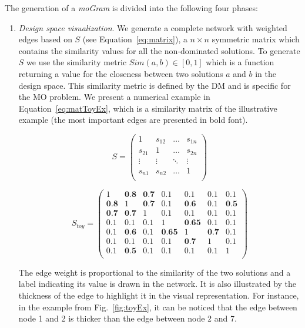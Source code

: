 \documentclass[journal]{IEEEtran}
\begin{document}
The generation of a \emph{moGram} is divided into the following four phases:
\begin{enumerate}

 \item \emph{Design space visualization}. We generate a complete network with weighted edges based on $S$ (see Equation~\ref{eq:matrix}), a $n\times n$ symmetric matrix which contains the similarity values for all the non-dominated solutions. To generate $S$ we use the similarity metric $Sim(a, b) \in [0,1]$ which is a function returning a value for the closeness between two solutions $a$ and $b$ in the design space. This similarity metric is defined by the DM and is specific for the MO problem. We present a numerical example in Equation~\ref{eq:matToyEx}, which is a similarity matrix of the illustrative example (the most important edges are presented in bold font).
 


\begin{equation}
\label{eq:matrix}
S = 
\left(
\begin{array}{cccc}
1 & s_{12} & \dots & s_{1n} \\
s_{21} & 1 & \dots & s_{2n} \\
\vdots & \vdots & \ddots & \vdots \\
s_{n1} & s_{n2} & \dots & 1 \\
\end{array}
\right)
\end{equation}

\begin{equation}
\label{eq:matToyEx}
S_{toy} = 
\left(
\begin{array}{ccccccc}
1 & \textbf{0.8} & \textbf{0.7} & 0.1 & 0.1 & 0.1 & 0.1 \\
\textbf{0.8} & 1 & \textbf{0.7} & 0.1 & \textbf{0.6} & 0.1 & \textbf{0.5} \\
\textbf{0.7} & \textbf{0.7} & 1 & 0.1 & 0.1 & 0.1 & 0.1 \\
0.1 & 0.1 & 0.1 & 1 & \textbf{0.65} & 0.1 & 0.1 \\
0.1 & \textbf{0.6} & 0.1 & \textbf{0.65} & 1 & \textbf{0.7} & 0.1 \\
0.1 & 0.1 & 0.1 & 0.1 & \textbf{0.7} & 1 & 0.1 \\
0.1 & \textbf{0.5} & 0.1 & 0.1 & 0.1 & 0.1 & 1 \\
\end{array}
\right)
\end{equation}

The edge weight is proportional to the similarity of the two solutions and a label indicating its value is drawn in the network. It is also illustrated by the thickness of the edge to highlight it in the visual representation. For instance, in the example from Fig.~\ref{fig:toyEx}, it can be noticed that the edge between node 1 and 2 is thicker than the edge between node 2 and 7.


\end{enumerate}
\end{document}
